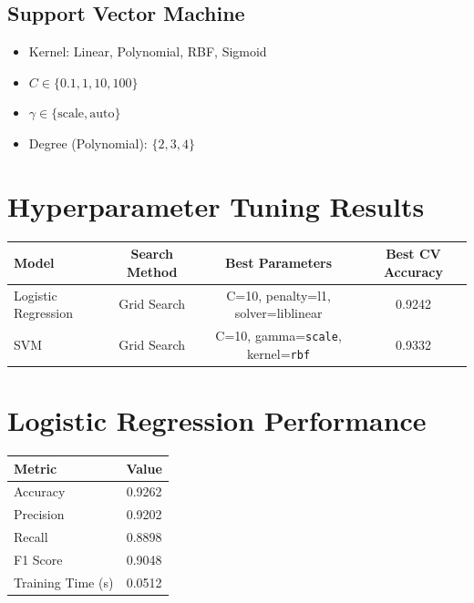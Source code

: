 \documentclass[11pt]{article}
\begin{document}
\subsection*{Support Vector Machine}
\begin{itemize}
\item Kernel: Linear, Polynomial, RBF, Sigmoid
\item $C \in \{0.1, 1, 10, 100\}$
\item $\gamma \in \{\text{scale}, \text{auto}\}$
\item Degree (Polynomial): $\{2,3,4\}$
\end{itemize}

\section*{Hyperparameter Tuning Results}
\begin{table}[h!]
\centering
\renewcommand{\arraystretch}{1.3}
\begin{tabular}{|l|c|c|c|}
\hline
Model & Search Method & Best Parameters & Best CV Accuracy \\ \hline
Logistic Regression & Grid Search & C=10, penalty=l1, solver=liblinear & 0.9242 \\
SVM & Grid Search & C=10, gamma=\texttt{scale}, kernel=\texttt{rbf} & 0.9332 \\ \hline
\end{tabular}
\end{table}

\section*{Logistic Regression Performance}
\begin{table}[h!]
\centering
\renewcommand{\arraystretch}{1.3}
\begin{tabular}{|l|c|}
\hline
Metric & Value \\ \hline
Accuracy & 0.9262 \\
Precision & 0.9202 \\
Recall & 0.8898 \\
F1 Score & 0.9048 \\
Training Time (s) & 0.0512 \\ \hline
\end{tabular}
\end{table}

\end{document}
